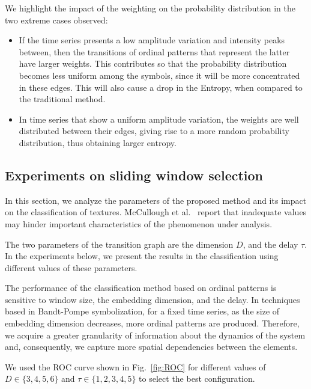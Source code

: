 \documentclass[journal]{IEEEtran}
\begin{document}
We highlight the impact of the weighting on the probability distribution in the two extreme cases observed:
\begin{itemize}
	\item If the time series presents a low amplitude variation and intensity peaks between, then the transitions of ordinal patterns that represent the latter have larger weights.
	This contributes so that the probability distribution becomes less uniform among the symbols, since it will be more concentrated in these edges.
	This will also cause a drop in the Entropy, when compared to the traditional method.
	\item In time series that show a uniform amplitude variation, the weights are well distributed between their edges, giving rise to a more random probability distribution, thus obtaining larger entropy.
\end{itemize}

\subsection{Experiments on sliding window selection}

In this section, we analyze the parameters of the proposed method and its impact on the classification of textures.
McCullough et al.~\cite{McCullough2015lagged} report that inadequate values may hinder important characteristics of the phenomenon under analysis.

The two parameters of the transition graph are the dimension $D$, and the delay $\tau$.
In the experiments below, we present the results in the classification using different values of these parameters.

The performance of the classification method based on ordinal patterns is sensitive to window size, the embedding dimension, and the delay.
In techniques based in Bandt-Pompe symbolization, for a fixed time series, as the size of embedding dimension decreases, more ordinal patterns are produced.
Therefore, we acquire a greater granularity of information about the dynamics of the system and, consequently, we capture more spatial dependencies between the elements.

We used the ROC curve shown in Fig.~\ref{fig:ROC} for different values of $D \in \{3, 4, 5, 6 \} $ and $\tau \in \{1, 2, 3, 4, 5 \}$ to select the best configuration.
\end{document}
